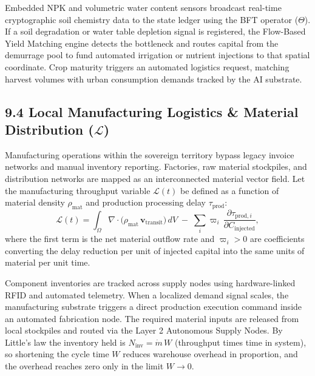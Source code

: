 \documentclass[11pt,a4paper]{article}
\theoremstyle{definition}
\theoremstyle{plain}
\theoremstyle{remark}
\begin{document}
Embedded NPK and volumetric water content sensors broadcast real-time cryptographic soil chemistry data to the state ledger using the BFT operator ($\Theta$). If a soil degradation or water table depletion signal is registered, the Flow-Based Yield Matching engine detects the bottleneck and routes capital from the demurrage pool to fund automated irrigation or nutrient injections to that spatial coordinate. Crop maturity triggers an automated logistics request, matching harvest volumes with urban consumption demands tracked by the AI substrate.

\subsection*{9.4 Local Manufacturing Logistics \& Material Distribution ($\mathcal L$)}
Manufacturing operations within the sovereign territory bypass legacy invoice networks and manual inventory reporting. Factories, raw material stockpiles, and distribution networks are mapped as an interconnected material vector field. Let the manufacturing throughput variable $\mathcal L(t)$ be defined as a function of material density $\rho_{\mathrm{mat}}$ and production processing delay $\tau_{\mathrm{prod}}$:
\begin{equation}
\mathcal L(t) = \int_\Omega \nabla\!\cdot\!\big( \rho_{\mathrm{mat}}\, \mathbf v_{\mathrm{transit}} \big)\, dV
\;-\; \sum_i \varpi_i\, \frac{\partial \tau_{\mathrm{prod},i}}{\partial C_{\mathrm{injected}}},
\end{equation}
where the first term is the net material outflow rate and $\varpi_i > 0$ are coefficients converting the delay reduction per unit of injected capital into the same units of material per unit time.

Component inventories are tracked across supply nodes using hardware-linked RFID and automated telemetry. When a localized demand signal scales, the manufacturing substrate triggers a direct production execution command inside an automated fabrication node. The required material inputs are released from local stockpiles and routed via the Layer 2 Autonomous Supply Nodes. By Little's law the inventory held is $N_{\mathrm{inv}} = \dot m\, W$ (throughput times time in system), so shortening the cycle time $W$ reduces warehouse overhead in proportion, and the overhead reaches zero only in the limit $W \to 0$.

\clearpage
\clearpage
\end{document}
